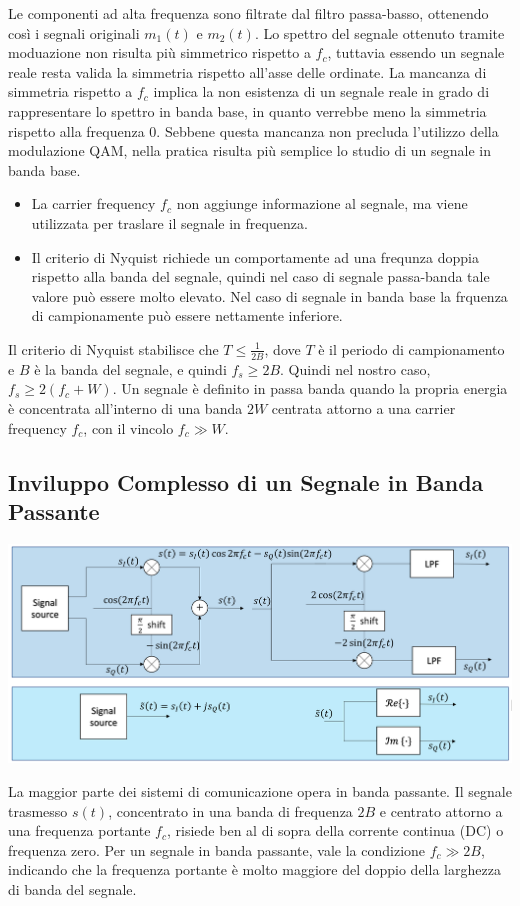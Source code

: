 Le componenti ad alta frequenza sono filtrate dal filtro passa-basso, ottenendo così i segnali originali \( m_1(t) \) e \( m_2(t) \).
Lo spettro del segnale ottenuto tramite moduazione non risulta più simmetrico rispetto a $f_c$, tuttavia essendo un segnale reale resta valida la simmetria rispetto all'asse delle ordinate.
La mancanza di simmetria rispetto a $f_c$ implica la non esistenza di un segnale reale in grado di rappresentare lo spettro in banda base, in quanto verrebbe meno la simmetria rispetto alla frequenza 0.
Sebbene questa mancanza non precluda l'utilizzo della modulazione QAM, nella pratica risulta più semplice lo studio di un segnale in banda base.
\begin{itemize}
    \item La carrier frequency \( f_c \) non aggiunge informazione al segnale, ma viene utilizzata per traslare il segnale in frequenza.
    \item Il criterio di Nyquist richiede un comportamente ad una frequnza doppia rispetto alla banda del segnale, quindi nel caso di segnale passa-banda tale valore può essere molto elevato. Nel caso di segnale in banda base la frquenza di campionamente può essere nettamente inferiore.
\end{itemize}

Il criterio di Nyquist stabilisce che \( T \leq \frac{1}{2B} \), dove \( T \) è il periodo di campionamento e \( B \) è la banda del segnale, e quindi \( f_s \geq 2B \). Quindi nel nostro caso, $f_s \geq 2(f_c + W)$.
Un segnale è definito in passa banda quando la propria energia è concentrata all'interno di una banda $2W$ centrata attorno a una carrier frequency $f_c$, con il vincolo $f_c \gg W$.  

\subsection*{Inviluppo Complesso di un Segnale in Banda Passante}
\begin{center}
    \includegraphics[width=1\textwidth]{imgs/complex_envelope.png}
\end{center}
La maggior parte dei sistemi di comunicazione opera in banda passante. Il segnale trasmesso \( s(t) \), concentrato in una banda di frequenza \( 2B \) e centrato attorno a una frequenza portante \( f_c \), risiede ben al di sopra della corrente continua (DC) o frequenza zero. Per un segnale in banda passante, vale la condizione \( f_c \gg 2B \), indicando che la frequenza portante è molto maggiore del doppio della larghezza di banda del segnale.

